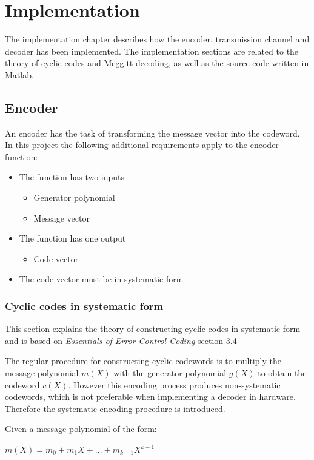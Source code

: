\documentclass[Main]{subfiles}
\begin{document}
\chapter{Implementation}
The implementation chapter describes how the encoder, transmission channel and decoder has been implemented. The implementation sections are related to the theory of cyclic codes and Meggitt decoding, as well as the source code written in Matlab.    

\section{Encoder}
An encoder has the task of transforming the message vector into the codeword. In this project the following additional requirements apply to the encoder function:

\begin{itemize}
\item The function has two inputs
	\begin{itemize}
	\item Generator polynomial
	\item Message vector
	\end{itemize}
\item The function has one output
	\begin{itemize}
	\item Code vector
	\end{itemize}
\item The code vector must be in systematic form
\end{itemize} 

\subsection{Cyclic codes in systematic form}
This section explains the theory of constructing cyclic codes in systematic form and is based on \emph{Essentials of Error Control Coding}\cite{essentials} section 3.4

The regular procedure for constructing cyclic codewords is to multiply the message polynomial $m(X)$ with the generator polynomial $g(X)$ to obtain the codeword $c(X)$. However this encoding process produces non-systematic codewords, which is not preferable when implementing a decoder in hardware. Therefore the systematic encoding procedure is introduced.

Given a message polynomial of the form:

{\centering 
$m(X) = m_0 + m_1X + ... + m_{k-1}X^{k-1}$ \par}
\end{document}
